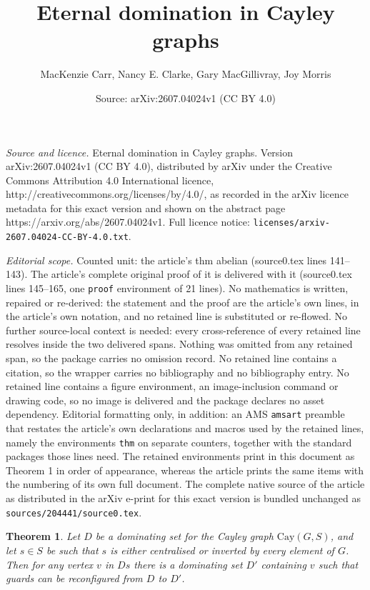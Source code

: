 \documentclass[10pt,a4paper]{amsart}
\title{Eternal domination in Cayley graphs}
\author{MacKenzie Carr, Nancy E. Clarke, Gary MacGillivray, Joy Morris}
\date{Source: arXiv:2607.04024v1 (CC BY 4.0)}
\newtheorem{thm}{Theorem}
\newcommand{\Cay}[2]{\mathrm{Cay}(#1,#2)}		%
\begin{document}
\maketitle

\noindent\emph{Source and licence.} Eternal domination in Cayley graphs. Version arXiv:2607.04024v1 (CC BY 4.0), distributed by arXiv under the Creative Commons Attribution 4.0 International licence, http://creativecommons.org/licenses/by/4.0/, as recorded in the arXiv licence metadata for this exact version and shown on the abstract page https://arxiv.org/abs/2607.04024v1. Full licence notice: \texttt{licenses/arxiv-2607.04024-CC-BY-4.0.txt}.\par\smallskip

\noindent\textit{Editorial scope.} Counted unit: the article's thm abelian (source0.tex lines 141--143). The article's complete original proof of it is delivered with it (source0.tex lines 145--165, one \texttt{proof} environment of 21 lines). No mathematics is written, repaired or re-derived: the statement and the proof are the article's own lines, in the article's own notation, and no retained line is substituted or re-flowed.  No further source-local context is needed: every cross-reference of every retained line resolves inside the two delivered spans.  Nothing was omitted from any retained span, so the package carries no omission record.  No retained line contains a citation, so the wrapper carries no bibliography and no bibliography entry.  No retained line contains a figure environment, an image-inclusion command or drawing code, so no image is delivered and the package declares no asset dependency.  Editorial formatting only, in addition: an AMS \texttt{amsart} preamble that restates the article's own declarations and macros used by the retained lines, namely the environments \texttt{thm} on separate counters, together with the standard packages those lines need.  The retained environments print in this document as Theorem 1 in order of appearance, whereas the article prints the same items with the numbering of its own full document.  The complete native source of the article as distributed in the arXiv e-print for this exact version is bundled unchanged as \texttt{sources/204441/source0.tex}.
\begin{thm}\label{abelian}
    Let $D$ be a dominating set for the Cayley graph $\Cay{G}{S}$, and let $s \in S$ be such that $s$ is either centralised or inverted by every element of $G$. Then for any vertex $v$ in $Ds$ there is a dominating set $D'$ containing $v$ such that guards can be reconfigured from $D$ to $D'$.
\end{thm}
\end{document}
